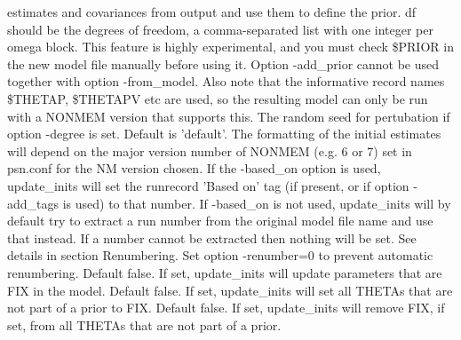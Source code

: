 \begin{optionlist}
estimates and covariances from output and use them to define the 
prior. df should be the degrees of freedom, a comma-separated list
with one integer per omega block.
This feature is highly experimental, and you must check \$PRIOR 
in the new model file manually before using it.
Option -add\_prior cannot be used together with option -from\_model. 
Also note that the informative record names \$THETAP, \$THETAPV etc are used,
so the resulting model can only be run with a NONMEM version that 
supports this.
\nextopt
{}
The random seed for pertubation if option -degree is set.
\nextopt
{}
Default is 'default'. The formatting of the initial estimates will depend on the
major version number of NONMEM (e.g. 6 or 7) set in psn.conf for the
NM version chosen.
\nextopt
{}
If the -based\_on option is used, update\_inits will set 
the runrecord 'Based on' tag (if present, or if option -add\_tags is used) 
to that number. 
If -based\_on is not used, update\_inits will by default try to extract 
a run number from the original model file name and use that instead.
If a number cannot be extracted then nothing will be set. 
\nextopt
{}
See details in section Renumbering.
Set option -renumber=0 to prevent automatic renumbering.
\nextopt
{}
Default false. If set, update\_inits will update parameters that are FIX in the model.
\nextopt
{}
Default false. If set, update\_inits will set all THETAs that are not part of a prior to FIX.
\nextopt
{}
Default false. If set, update\_inits will remove FIX, if set, from all THETAs that are not part of a prior.
\nextopt

\end{optionlist}


